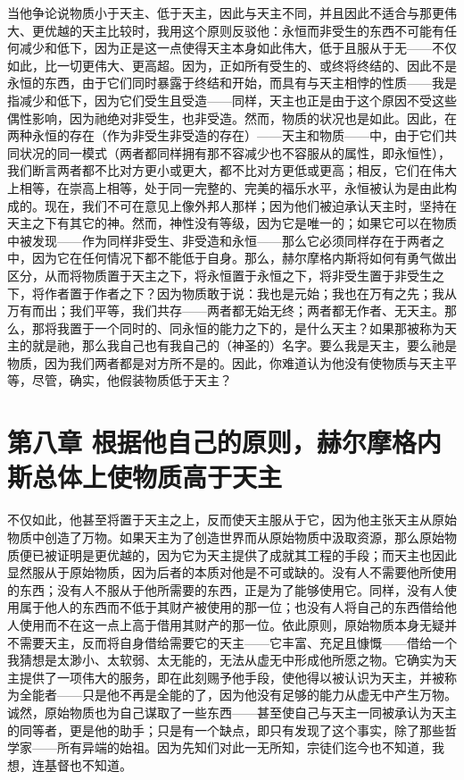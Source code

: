 当他争论说物质小于天主、低于天主，因此与天主不同，并且因此不适合与那更伟大、更优越的天主比较时，我用这个原则反驳他：永恒而非受生的东西不可能有任何减少和低下，因为正是这一点使得天主本身如此伟大，低于且服从于无——不仅如此，比一切更伟大、更高超。因为，正如所有受生的、或终将终结的、因此不是永恒的东西，由于它们同时暴露于终结和开始，而具有与天主相悖的性质——我是指减少和低下，因为它们受生且受造——同样，天主也正是由于这个原因不受这些偶性影响，因为祂绝对非受生，也非受造。然而，物质的状况也是如此。因此，在两种永恒的存在（作为非受生非受造的存在）——天主和物质——中，由于它们共同状况的同一模式（两者都同样拥有那不容减少也不容服从的属性，即永恒性），我们断言两者都不比对方更小或更大，都不比对方更低或更高；相反，它们在伟大上相等，在崇高上相等，处于同一完整的、完美的福乐水平，永恒被认为是由此构成的。现在，我们不可在意见上像外邦人那样；因为他们被迫承认天主时，坚持在天主之下有其它的神。然而，神性没有等级，因为它是唯一的；如果它可以在物质中被发现——作为同样非受生、非受造和永恒——那么它必须同样存在于两者之中，因为它在任何情况下都不能低于自身。那么，赫尔摩格内斯将如何有勇气做出区分，从而将物质置于天主之下，将永恒置于永恒之下，将非受生置于非受生之下，将作者置于作者之下？因为物质敢于说：我也是元始；我也在万有之先；我从万有而出；我们平等，我们共存——两者都无始无终；两者都无作者、无天主。那么，那将我置于一个同时的、同永恒的能力之下的，是什么天主？如果那被称为天主的就是祂，那么我自己也有我自己的（神圣的）名字。要么我是天主，要么祂是物质，因为我们两者都是对方所不是的。因此，你难道认为他没有使物质与天主平等，尽管，确实，他假装物质低于天主？\par


\section{第八章 根据他自己的原则，赫尔摩格内斯总体上使物质高于天主}

不仅如此，他甚至将置于天主之上，反而使天主服从于它，因为他主张天主从原始物质中创造了万物。如果天主为了创造世界而从原始物质中汲取资源，那么原始物质便已被证明是更优越的，因为它为天主提供了成就其工程的手段；而天主也因此显然服从于原始物质，因为后者的本质对他是不可或缺的。没有人不需要他所使用的东西；没有人不服从于他所需要的东西，正是为了能够使用它。同样，没有人使用属于他人的东西而不低于其财产被使用的那一位；也没有人将自己的东西借给他人使用而不在这一点上高于借用其财产的那一位。依此原则，原始物质本身无疑并不需要天主，反而将自身借给需要它的天主——它丰富、充足且慷慨——借给一个我猜想是太渺小、太软弱、太无能的，无法从虚无中形成他所愿之物。它确实为天主提供了一项伟大的服务，即在此刻赐予他手段，使他得以被认识为天主，并被称为全能者——只是他不再是全能的了，因为他没有足够的能力从虚无中产生万物。诚然，原始物质也为自己谋取了一些东西——甚至使自己与天主一同被承认为天主的同等者，更是他的助手；只是有一个缺点，即只有发现了这个事实，除了那些哲学家——所有异端的始祖。因为先知们对此一无所知，宗徒们迄今也不知道，我想，连基督也不知道。\par

